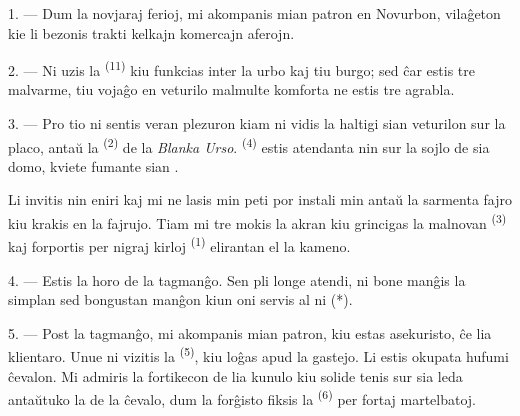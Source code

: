 

\VUsaut{4.0mm}
\VUsaut{3.0mm}
\VUfilet{16mm}
\VUsaut{5.6mm}
\VUsaut{3.0mm}

\VUsaut{3.0mm}

\VUsaut{4.0mm}

1. --- Dum la novjaraj ferioj, mi akompanis mian patron en Novurbon, vilaĝeton
kie li bezonis trakti kelkajn komercajn aferojn.

2. --- Ni uzis la  \textsuperscript{(11)} kiu funkcias inter
la urbo kaj tiu burgo; sed ĉar estis tre malvarme, tiu vojaĝo en veturilo
malmulte komforta ne estis tre agrabla.

3. --- Pro tio ni sentis veran plezuron kiam ni vidis la 
haltigi sian veturilon sur la placo, antaŭ la 
\textsuperscript{(2)} de la \textit{Blanka Urso}. 
\textsuperscript{(4)} estis atendanta nin sur la sojlo de sia domo, kviete
fumante sian .

Li invitis nin eniri kaj mi ne lasis min peti por instali min antaŭ la
sarmenta fajro kiu krakis en la fajrujo. Tiam mi tre mokis la akran
 kiu grincigas la malnovan 
\textsuperscript{(3)} kaj forportis per nigraj kirloj 
\textsuperscript{(1)} elirantan el la kameno.

4. --- Estis la horo de la tagmanĝo. Sen pli longe atendi, ni bone manĝis la
simplan sed bongustan manĝon kiun oni servis al ni (*).

\VUsaut{3.0mm}

5. --- Post la tagmanĝo, mi akompanis mian patron, kiu estas asekuristo, ĉe lia
klientaro. Unue ni vizitis la  \textsuperscript{(5)}, kiu
loĝas apud la gastejo. Li estis okupata hufumi ĉevalon. Mi admiris la
fortikecon de lia kunulo kiu solide tenis sur sia leda antaŭtuko la
 de la ĉevalo, dum la forĝisto fiksis la 
\textsuperscript{(6)} per fortaj martelbatoj.

